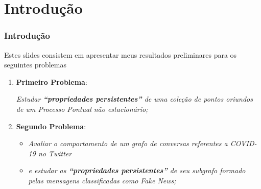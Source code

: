 \documentclass[11pt]{beamer}
\theoremstyle{remark}
\theoremstyle{definition}
\theoremstyle{plain}
\begin{document}
    \begin{frame}
        \frametitle{}
        \maketitle
        \tableofcontents
    \end{frame}

\section{Introdução}
    \begin{frame}
        \frametitle{Introdução}

        Estes slides consistem em apresentar meus resultados
        preliminares para os seguintes problemas

        \begin{enumerate}
            \item \textbf{Primeiro Problema}:
            \begin{center}
                    \emph{
                        Estudar \textbf{``propriedades persistentes''} de uma
                        coleção de pontos oriundos de um Processo
                        Pontual não estacionário;
                    }
            \end{center}

        \item \textbf{Segundo Problema}:
            \begin{center}
                \begin{itemize}
                    \item
                        \emph{
                            Avaliar o comportamento de um grafo de conversas
                            referentes a COVID-19 no Twitter
                        }
                    \item
                        \emph{ e estudar as
                            \textbf{``propriedades persistentes''} de seu subgrafo formado
                            pelas mensagens classificadas como Fake News;
                        }
                \end{itemize}
            \end{center}
        \end{enumerate}
    \end{frame}
\end{document}
